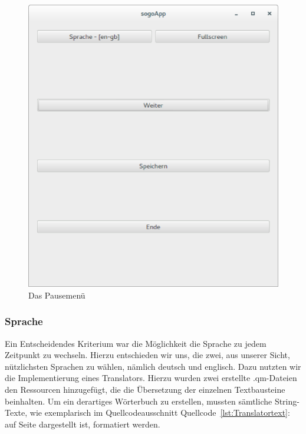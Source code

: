 \documentclass[a4paper]{scrartcl}
\begin{document}
\begin{figure}[H]
 \centering
 \includegraphics[scale=0.35]{graphics/pausemenu.eps}
 \caption{Das Pausemenü}
 \label{fig:Pausemenü}
\end{figure}

\subsubsection{Sprache}\label{ch:Sprache}
Ein Entscheidendes Kriterium war die Möglichkeit die Sprache zu jedem Zeitpunkt zu wechseln. Hierzu entschieden wir uns, die zwei, aus unserer Sicht, nützlichsten Sprachen zu wählen, nämlich deutsch und englisch. Dazu nutzten wir die Implementierung eines Translators. Hierzu wurden zwei erstellte .qm-Dateien den Ressourcen hinzugefügt, die die Übersetzung der einzelnen Textbausteine beinhalten. Um ein derartiges Wörterbuch zu erstellen, mussten sämtliche String-Texte, wie exemplarisch im Quellcodeausschnitt Quellcode~\ref{lst:Translatortext}: auf Seite \pageref{lst:Translatortext} dargestellt ist, formatiert werden. 
\end{document}
